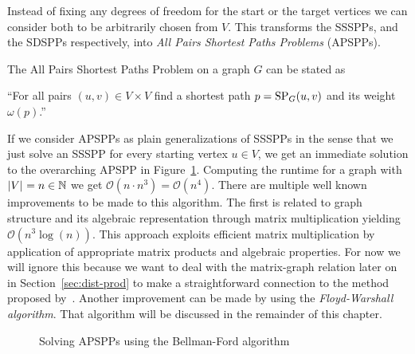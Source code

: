Instead of fixing any degrees of freedom for the start or the target vertices we can consider both to be arbitrarily chosen from $V$.
This transforms the SSSPPs, and the SDSPPs respectively, into \emph{All Pairs Shortest Paths Problems} (APSPPs).

\begin{definition}
    The All Pairs Shortest Paths Problem on a graph $G$ can be stated as
    \begin{displayquote}
        ``For all pairs $(u, v) \in V \times V$ find a shortest path $p = \operatorname{SP}_G(u, v)$ and its weight $\omega(p)$.''
    \end{displayquote}
\end{definition}

If we consider APSPPs as plain generalizations of SSSPPs in the sense that we just solve an SSSPP for every starting vertex $u \in V$, we get an immediate solution to the overarching APSPP in Figure~\ref{alg:bellman-ford-apsp}.
Computing the runtime for a graph with $\left\lvert V\right\rvert_{} = n \in \mathbb{N}$ we get $\mathcal{O}\left( n \cdot n^3 \right) = \mathcal{O}\left( n^4 \right)$.
There are multiple well known improvements to be made to this algorithm.
The first is related to graph structure and its algebraic representation through matrix multiplication yielding $\mathcal{O}\left( n^3 \log(n) \right)$.
This approach exploits efficient matrix multiplication by application of appropriate matrix products and algebraic properties.
For now we will ignore this because we want to deal with the matrix-graph relation later on in Section~\ref{sec:dist-prod} to make a straightforward connection to the method proposed by~\cite{Chan2007}.
Another improvement can be made by using the \emph{Floyd-Warshall algorithm}.
That algorithm will be discussed in the remainder of this chapter.

\begin{figure}[ht]
    \centering
    \begin{minipage}{.5\textwidth}
        \begin{algorithm}[H]
        \end{algorithm}
    \end{minipage}
    \caption{Solving APSPPs using the Bellman-Ford algorithm\label{alg:bellman-ford-apsp}}
\end{figure}

